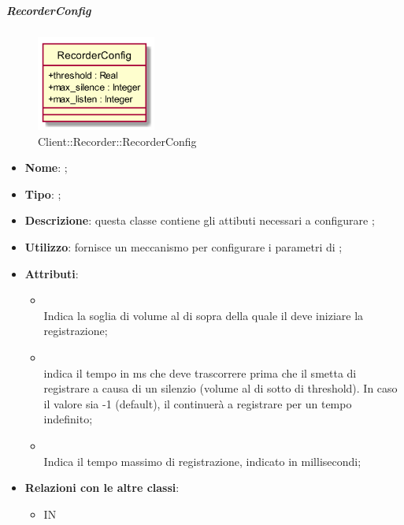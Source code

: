 \hypertarget{RecorderConfig_label}{\subparagraph{RecorderConfig}}
\begin{figure}[h]
	\centering
	\includegraphics[width=0.35\textwidth,height=\textheight,keepaspectratio]{images/ClassRecorderConfig.png}
	\caption{Client::Recorder::RecorderConfig}
\end{figure}
\begin{itemize}
	\item \textbf{Nome}: ;
	\item \textbf{Tipo}: ;
	\item \textbf{Descrizione}: questa classe contiene gli attibuti necessari a configurare ;
	\item \textbf{Utilizzo}: fornisce un meccanismo per configurare i parametri di ;
	\item \textbf{Attributi}:
	\begin{itemize}
		\item[]  \\
		Indica la soglia di volume al di sopra della quale il  deve iniziare la registrazione;
		\item[]  \\
		indica il tempo in ms che deve trascorrere prima che il  smetta di registrare a causa di un silenzio (volume al di sotto di threshold). In caso il valore sia -1 (default), il  continuerà a registrare per un tempo indefinito;
		\item[]  \\
		Indica il tempo massimo di registrazione, indicato in millisecondi;
	\end{itemize}
	\item \textbf{Relazioni con le altre classi}:
	\begin{itemize}
		\item IN \hyperlink{Recorder_label}{}
	\end{itemize}
\end{itemize}
\FloatBarrier

